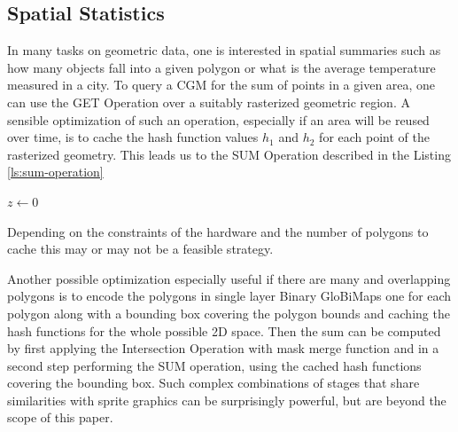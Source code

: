 \documentclass[sigconf]{acmart}
\begin{document}



\subsection{Spatial Statistics}\label{spatial-statistics}
In many tasks on geometric data, one is interested in spatial summaries such as how many objects fall into a given polygon or what is the average temperature measured in a city. To query a CGM for the sum of points in a given area, one can use the GET Operation over a suitably rasterized geometric region. A sensible optimization of such an operation, especially if an area will be reused over time, is to cache the hash function values $h_1$ and $h_2$ for each point of the rasterized geometry. This leads us to the SUM Operation described in the Listing \ref{ls:sum-operation}

\begin{algorithm}[h!]
  \SetAlgoLined
  $z \leftarrow 0$

  \caption{SUM Operation}
  \label{ls:sum-operation}
\end{algorithm}

Depending on the constraints of the hardware and the number of polygons to cache this may or may not be a feasible strategy.

Another possible optimization especially useful if there are many and overlapping polygons is to encode the polygons in single layer Binary GloBiMaps one for each polygon along with a bounding box covering the polygon bounds and caching the hash functions for the whole possible 2D space. Then the sum can be computed by first applying the Intersection Operation with mask merge function and in a second step performing the SUM operation, using the cached hash functions covering the bounding box. Such complex combinations of stages that share similarities with sprite graphics can be surprisingly powerful, but are beyond the scope of this paper.
\end{document}
